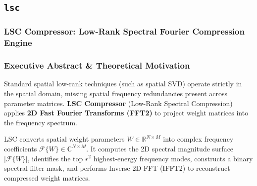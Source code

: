 \subsection{\texttt{lsc}}
\subsubsection*{LSC Compressor: Low-Rank Spectral Fourier Compression Engine}

\subsubsection*{Executive Abstract \& Theoretical Motivation}

Standard spatial low-rank techniques (such as spatial SVD) operate strictly in the spatial domain, missing spatial frequency redundancies present across parameter matrices. \textbf{LSC Compressor} (Low-Rank Spectral Compression) applies \textbf{2D Fast Fourier Transforms (FFT2)} to project weight matrices into the frequency spectrum.

LSC converts spatial weight parameters $W \in \mathbb{R}^{N \times M}$ into complex frequency coefficients $\mathcal{F}\{W\} \in \mathbb{C}^{N \times M}$. It computes the 2D spectral magnitude surface $|\mathcal{F}\{W\}|$, identifies the top $r^2$ highest-energy frequency modes, constructs a binary spectral filter mask, and performs Inverse 2D FFT (IFFT2) to reconstruct compressed weight matrices.

